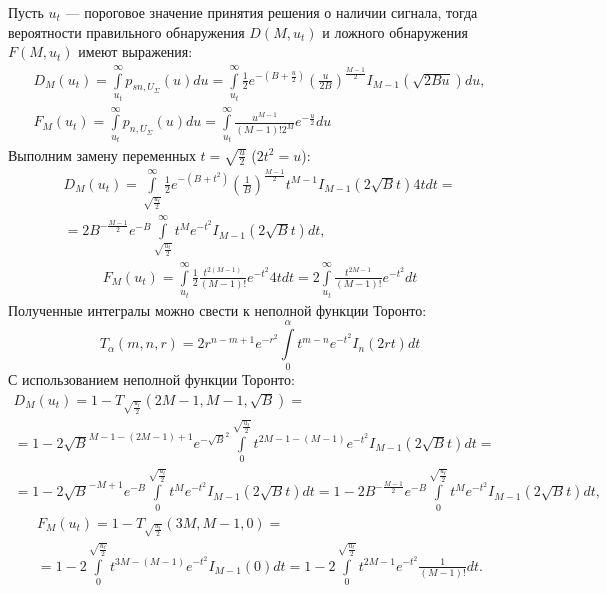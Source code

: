 \documentclass[a4paper,12pt]{article}
\begin{document}
    Пусть $u_t$ --- пороговое значение принятия решения о наличии сигнала, тогда вероятности правильного обнаружения $D(M, u_t)$ и ложного обнаружения $F(M, u_t)$ имеют выражения:
    \begin{gather}
        D_M(u_t)
        = \int \limits_{u_t}^{\infty} p_{sn,U_\Sigma}(u) du
        = \int \limits_{u_t}^{\infty} \frac{1}{2} e^{- \left ( B + \frac{u}{2} \right )} \left ( \frac{u}{2 B} \right )^\frac{M-1}{2} I_{M-1} \left ( \sqrt{2 B u}\right ) du ,
        \label{quadric_pack:true_detection_probability} \\
        F_M(u_t)
        = \int \limits_{u_t}^{\infty} p_{n,U_\Sigma}(u) du
        = \int \limits_{u_t}^{\infty} \frac{u^{M-1}}{(M-1)! 2^{M}} e^{- \frac{u}{2}} du
        \label{quadric_pack:false_detection_probability}
    \end{gather}
    Выполним замену переменных $t = \sqrt{\frac{u}{2}}$ ($2 t^2 = u$):
    \begin{multline*}
        D_M(u_t)
        = \int \limits_{\sqrt{\frac{u_t}{2}}}^{\infty} \frac{1}{2} e^{- \left ( B + t^2 \right )} \left ( \frac{1}{B} \right )^\frac{M-1}{2} t^{M-1} I_{M-1} \left ( 2 \sqrt{B} t \right ) 4 t dt = \\
        = 2 B^{-\frac{M-1}{2}} e^{-B} \int \limits_{\sqrt{\frac{u_t}{2}}}^{\infty} t^M e^{- t^2} I_{M-1} \left ( 2 \sqrt{B} t \right ) dt,
    \end{multline*}
    \begin{gather*}
        F_M(u_t)
        = \int \limits_{u_t}^{\infty} \frac{1}{2} \frac{t^{2(M-1)}}{(M-1)!} e^{- t^2} 4 t dt
        = 2 \int \limits_{u_t}^{\infty} \frac{t^{2M-1}}{(M-1)!} e^{- t^2} dt
    \end{gather*}
    Полученные интегралы можно свести к неполной функции Торонто:
    \[
        T_\alpha (m, n, r) = 2 r^{n-m+1} e^{-r^2} \int \limits_0^{\alpha} t^{m-n} e^{-t^2} I_n(2rt) dt
    \]
    С использованием неполной функции Торонто:
    \begin{multline*}
        D_M(u_t)
        = 1 - T_{\sqrt{\frac{u_t}{2}}} \left ( 2M - 1, M - 1, \sqrt{B} \right ) = \\
        = 1 - 2 \sqrt{B}^{M-1-(2M-1)+1} e^{-\sqrt{B}^2} \int \limits_0^{\sqrt{\frac{u_t}{2}}} t^{2M-1-(M-1)} e^{-t^2} I_{M-1}(2 \sqrt{B} t) dt = \\
        = 1 - 2 \sqrt{B}^{-M+1} e^{- B} \int \limits_0^{\sqrt{\frac{u_t}{2}}} t^{M} e^{-t^2} I_{M-1}(2 \sqrt{B} t) dt
        = 1 - 2 B^{- \frac{M-1}{2}} e^{-B} \int \limits_0^{\sqrt{\frac{u_t}{2}}} t^{M} e^{-t^2} I_{M-1}(2 \sqrt{B} t) dt ,
    \end{multline*}
    \begin{multline*}
        F_M(u_t)
        = 1 - T_{\sqrt{\frac{u_t}{2}}} \left ( 3M, M - 1, 0 \right ) = \\
        = 1 - 2 \int \limits_0^{\sqrt{\frac{u_t}{2}}} t^{3M-(M-1)} e^{-t^2} I_{M-1}(0) dt
        = 1 - 2 \int \limits_0^{\sqrt{\frac{u_t}{2}}} t^{2M-1} e^{-t^2} \frac{1}{(M-1)!} dt .
    \end{multline*}
\end{document}
